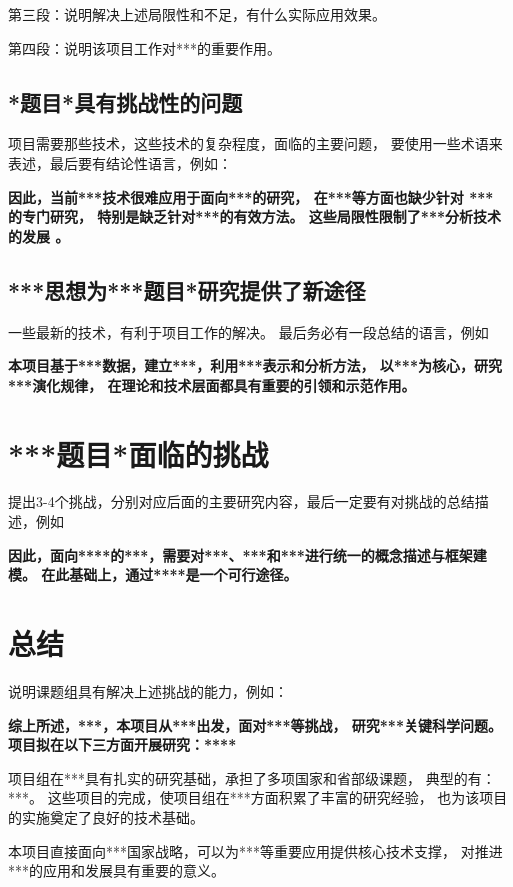 \documentclass[12pt]{article}
\newcommand{\myEmph}[1]{\textbf{\textcolor[rgb]{0,0,0.25}{#1}}}
\begin{document}
第三段：说明解决上述局限性和不足，有什么实际应用效果。

第四段：说明该项目工作对***的重要作用。


\subsection{*题目*具有挑战性的问题}

项目需要那些技术，这些技术的复杂程度，面临的主要问题，
要使用一些术语来表述，最后要有结论性语言，例如：

\myEmph{因此，当前***技术很难应用于面向***的研究，
在***等方面也缺少针对 *** 的专门研究，
特别是缺乏针对***的有效方法。
这些局限性限制了***分析技术的发展 。
}


\subsection{***思想为***题目*研究提供了新途径}

一些最新的技术，有利于项目工作的解决。
最后务必有一段总结的语言，例如

\myEmph{本项目基于***数据，建立***，利用***表示和分析方法，
以***为核心，研究***演化规律，
在理论和技术层面都具有重要的引领和示范作用。}


\section{***题目*面临的挑战}

提出3-4个挑战，分别对应后面的主要研究内容，最后一定要有对挑战的总结描述，例如

\myEmph{因此，面向****的***，需要对***、***和***进行统一的概念描述与框架建模。
在此基础上，通过****是一个可行途径。}


\section{总结}

说明课题组具有解决上述挑战的能力，例如：

\myEmph{综上所述，***，本项目从***出发，面对***等挑战，
研究***关键科学问题。
项目拟在以下三方面开展研究：****}


项目组在***具有扎实的研究基础，承担了多项国家和省部级课题， 典型的有：***。
这些项目的完成，使项目组在***方面积累了丰富的研究经验，
也为该项目的实施奠定了良好的技术基础。

本项目直接面向***国家战略，可以为***等重要应用提供核心技术支撑，
对推进***的应用和发展具有重要的意义。
\end{document}
